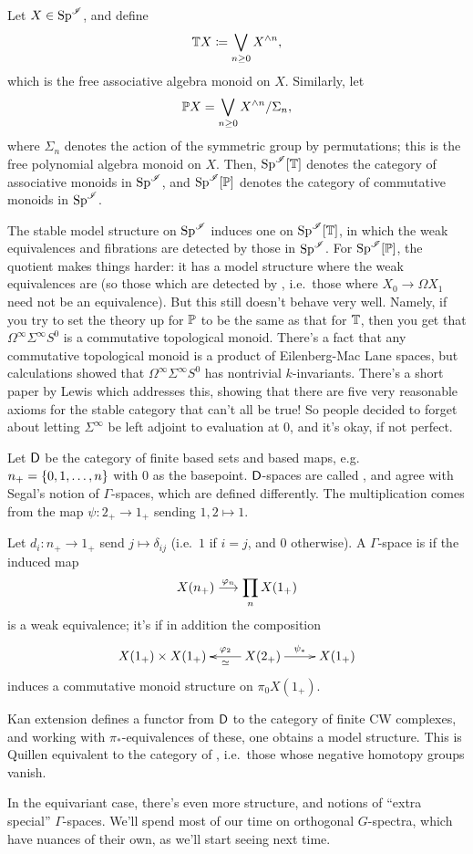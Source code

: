Let $X\in\Sp^\sI$, and define
\[\T X\coloneqq\bigvee_{n\ge 0} X^{\wedge n},\]
which is the free associative algebra monoid on $X$. Similarly, let
\[\P X = \bigvee_{n\ge 0} X^{\wedge n}/\Sigma_n,\]
where $\Sigma_n$ denotes the action of the symmetric group by permutations; this is the free polynomial algebra
monoid on $X$. Then, $\Sp^\sI[\T]$ denotes the category of associative monoids in $\Sp^\sI$, and $\Sp^\sI[\P]$
denotes the category of commutative monoids in $\Sp^\sI$.

The stable model structure on $\Sp^\sI$ induces one on $\Sp^\sI[\T]$, in which the weak equivalences and fibrations
are detected by those in $\Sp^\sI$. For $\Sp^\sI[\P]$, the quotient makes things harder: it has a model structure
where the weak equivalences are  (so those which are detected by , i.e.\ those where $X_0\to\Omega X_1$ need not be an equivalence). But this still doesn't behave
very well. Namely, if you try to set the theory up for $\P$ to be the same as that for $\T$, then you get that
$\Omega^\infty\Sigma^\infty S^0$ is a commutative topological monoid. There's a fact that any commutative
topological monoid is a product of Eilenberg-Mac Lane spaces, but calculations showed that
$\Omega^\infty\Sigma^\infty S^0$ has nontrivial $k$-invariants. There's a short paper by Lewis which addresses
this, showing that there are five very reasonable axioms for the stable category that can't all be true! So people
decided to forget about letting $\Sigma^\infty$ be left adjoint to evaluation at $0$, and it's okay, if not
perfect.
\begin{exm}
Let $\fD$ be the category of finite based sets and based maps, e.g.\ $n_+ = \set{0,1,\dotsc,n}$ with $0$ as the
basepoint. $\fD$-spaces are called , and agree with Segal's notion of $\Gamma$-spaces, which
are defined differently. The multiplication comes from the map $\psi\colon 2_+\to 1_+$ sending $1,2\mapsto 1$.

Let $d_i:n_+\to 1_+$ send $j\mapsto\delta_{ij}$ (i.e.\ $1$ if $i = j$, and $0$ otherwise). A $\Gamma$-space is
 if the induced map
\[X(n_+)\stackrel{\vp_n}{\longrightarrow} \prod_n X(1_+)\]
is a weak equivalence; it's  if in addition the composition
\[\xymatrix{
	X(1_+)\times X(1_+) & X(2_+)\ar[l]^-\simeq_-{\vp_2}\ar[r]^{\psi_*} &X(1_+)
}\]
induces a commutative monoid structure on $\pi_0 X(1_+)$.

Kan extension defines a functor from $\fD$ to the category of finite CW complexes, and working with
$\pi_*$-equivalences of these, one obtains a model structure. This is Quillen equivalent to the category of
, i.e.\ those whose negative homotopy groups vanish.
\end{exm}
In the equivariant case, there's even more structure, and notions of ``extra special'' $\Gamma$-spaces. We'll spend
most of our time on orthogonal $G$-spectra, which have nuances of their own, as we'll start seeing next time.
